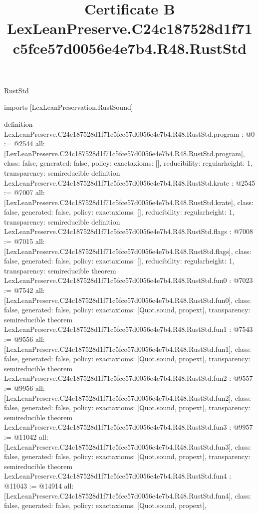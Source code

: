 \begin{lexlean}{RustStd}
\title{Certificate B LexLeanPreserve.C24c187528d1f71c5fce57d0056e4e7b4.R48.RustStd}
\begin{coremodule}
imports [LexLeanPreservation.RustSound]

definition LexLeanPreserve.C24c187528d1f71c5fce57d0056e4e7b4.R48.RustStd.program : @0 := @2544 {
  all: [LexLeanPreserve.C24c187528d1f71c5fce57d0056e4e7b4.R48.RustStd.program],
  class: false,
  generated: false,
  policy: exact{axioms: []},
  reducibility: regular{height: 1},
  transparency: semireducible
}
definition LexLeanPreserve.C24c187528d1f71c5fce57d0056e4e7b4.R48.RustStd.krate : @2545 := @7007 {
  all: [LexLeanPreserve.C24c187528d1f71c5fce57d0056e4e7b4.R48.RustStd.krate],
  class: false,
  generated: false,
  policy: exact{axioms: []},
  reducibility: regular{height: 1},
  transparency: semireducible
}
definition LexLeanPreserve.C24c187528d1f71c5fce57d0056e4e7b4.R48.RustStd.flags : @7008 := @7015 {
  all: [LexLeanPreserve.C24c187528d1f71c5fce57d0056e4e7b4.R48.RustStd.flags],
  class: false,
  generated: false,
  policy: exact{axioms: []},
  reducibility: regular{height: 1},
  transparency: semireducible
}
theorem LexLeanPreserve.C24c187528d1f71c5fce57d0056e4e7b4.R48.RustStd.fun0 : @7023 := @7542 {
  all: [LexLeanPreserve.C24c187528d1f71c5fce57d0056e4e7b4.R48.RustStd.fun0],
  class: false,
  generated: false,
  policy: exact{axioms: [Quot.sound, propext]},
  transparency: semireducible
}
theorem LexLeanPreserve.C24c187528d1f71c5fce57d0056e4e7b4.R48.RustStd.fun1 : @7543 := @9556 {
  all: [LexLeanPreserve.C24c187528d1f71c5fce57d0056e4e7b4.R48.RustStd.fun1],
  class: false,
  generated: false,
  policy: exact{axioms: [Quot.sound, propext]},
  transparency: semireducible
}
theorem LexLeanPreserve.C24c187528d1f71c5fce57d0056e4e7b4.R48.RustStd.fun2 : @9557 := @9956 {
  all: [LexLeanPreserve.C24c187528d1f71c5fce57d0056e4e7b4.R48.RustStd.fun2],
  class: false,
  generated: false,
  policy: exact{axioms: [Quot.sound, propext]},
  transparency: semireducible
}
theorem LexLeanPreserve.C24c187528d1f71c5fce57d0056e4e7b4.R48.RustStd.fun3 : @9957 := @11042 {
  all: [LexLeanPreserve.C24c187528d1f71c5fce57d0056e4e7b4.R48.RustStd.fun3],
  class: false,
  generated: false,
  policy: exact{axioms: [Quot.sound, propext]},
  transparency: semireducible
}
theorem LexLeanPreserve.C24c187528d1f71c5fce57d0056e4e7b4.R48.RustStd.fun4 : @11043 := @14914 {
  all: [LexLeanPreserve.C24c187528d1f71c5fce57d0056e4e7b4.R48.RustStd.fun4],
  class: false,
  generated: false,
  policy: exact{axioms: [Quot.sound, propext]},
}
\end{coremodule}
\end{lexlean}
